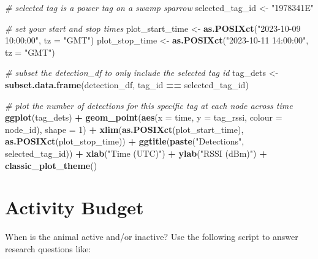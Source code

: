 \documentclass[
]{book}
\newenvironment{Shaded}{\begin{snugshade}}{\end{snugshade}}
\newcommand{\AttributeTok}[1]{\textcolor[rgb]{0.13,0.29,0.53}{#1}}
\newcommand{\CommentTok}[1]{\textcolor[rgb]{0.56,0.35,0.01}{\textit{#1}}}
\newcommand{\DecValTok}[1]{\textcolor[rgb]{0.00,0.00,0.81}{#1}}
\newcommand{\FunctionTok}[1]{\textcolor[rgb]{0.13,0.29,0.53}{\textbf{#1}}}
\newcommand{\NormalTok}[1]{#1}
\newcommand{\OtherTok}[1]{\textcolor[rgb]{0.56,0.35,0.01}{#1}}
\newcommand{\SpecialCharTok}[1]{\textcolor[rgb]{0.81,0.36,0.00}{\textbf{#1}}}
\newcommand{\StringTok}[1]{\textcolor[rgb]{0.31,0.60,0.02}{#1}}
\begin{document}
\begin{Shaded}
\begin{Highlighting}[]
\CommentTok{\# selected tag is a power tag on a swamp sparrow}
\NormalTok{selected\_tag\_id }\OtherTok{\textless{}{-}} \StringTok{"1978341E"}

\CommentTok{\# set your start and stop times}
\NormalTok{plot\_start\_time }\OtherTok{\textless{}{-}} \FunctionTok{as.POSIXct}\NormalTok{(}\StringTok{"2023{-}10{-}09 10:00:00"}\NormalTok{, }\AttributeTok{tz =} \StringTok{"GMT"}\NormalTok{)}
\NormalTok{plot\_stop\_time }\OtherTok{\textless{}{-}} \FunctionTok{as.POSIXct}\NormalTok{(}\StringTok{"2023{-}10{-}11 14:00:00"}\NormalTok{, }\AttributeTok{tz =} \StringTok{"GMT"}\NormalTok{)}

\CommentTok{\# subset the detection\_df to only include the selected tag id}
\NormalTok{tag\_dets }\OtherTok{\textless{}{-}} \FunctionTok{subset.data.frame}\NormalTok{(detection\_df, tag\_id }\SpecialCharTok{==}\NormalTok{ selected\_tag\_id)}

\CommentTok{\# plot the number of detections for this specific tag at each node across time}
\FunctionTok{ggplot}\NormalTok{(tag\_dets) }\SpecialCharTok{+}
  \FunctionTok{geom\_point}\NormalTok{(}\FunctionTok{aes}\NormalTok{(}\AttributeTok{x =}\NormalTok{ time, }
                 \AttributeTok{y =}\NormalTok{ tag\_rssi, }
                 \AttributeTok{colour =}\NormalTok{ node\_id), }
             \AttributeTok{shape =} \DecValTok{1}\NormalTok{) }\SpecialCharTok{+}
  \FunctionTok{xlim}\NormalTok{(}\FunctionTok{as.POSIXct}\NormalTok{(plot\_start\_time), }
       \FunctionTok{as.POSIXct}\NormalTok{(plot\_stop\_time)) }\SpecialCharTok{+}
  \FunctionTok{ggtitle}\NormalTok{(}\FunctionTok{paste}\NormalTok{(}\StringTok{"Detections"}\NormalTok{, }
\NormalTok{                selected\_tag\_id)) }\SpecialCharTok{+}
  \FunctionTok{xlab}\NormalTok{(}\StringTok{"Time (UTC)"}\NormalTok{) }\SpecialCharTok{+}
  \FunctionTok{ylab}\NormalTok{(}\StringTok{"RSSI (dBm)"}\NormalTok{) }\SpecialCharTok{+}
  \FunctionTok{classic\_plot\_theme}\NormalTok{()}
\end{Highlighting}
\end{Shaded}

\chapter{Activity Budget}\label{activity-budget}

When is the animal active and/or inactive? Use the following script to answer research questions like:
\end{document}
